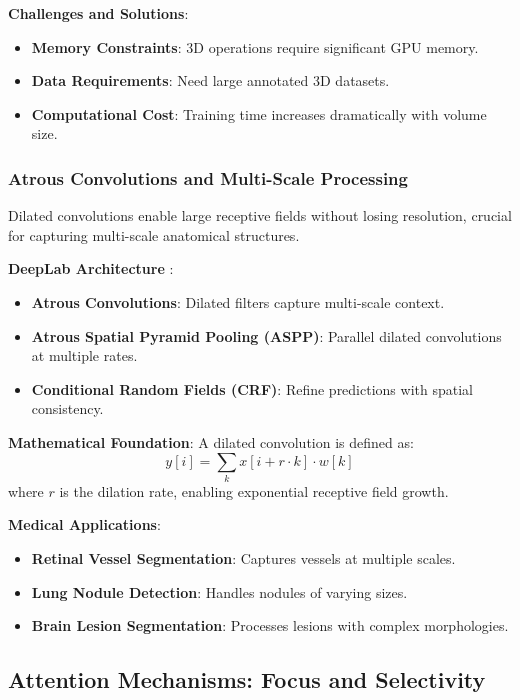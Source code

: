 \documentclass[12pt,a4paper]{article}
\begin{document}
\textbf{Challenges and Solutions}:
\begin{itemize}
    \item \textbf{Memory Constraints}: 3D operations require significant GPU memory.
    \item \textbf{Data Requirements}: Need large annotated 3D datasets.
    \item \textbf{Computational Cost}: Training time increases dramatically with volume size.
\end{itemize}

\subsubsection{Atrous Convolutions and Multi-Scale Processing}

Dilated convolutions enable large receptive fields without losing resolution, crucial for capturing multi-scale anatomical structures.

\textbf{DeepLab Architecture} \cite{chen2017deeplab}:
\begin{itemize}
    \item \textbf{Atrous Convolutions}: Dilated filters capture multi-scale context.
    \item \textbf{Atrous Spatial Pyramid Pooling (ASPP)}: Parallel dilated convolutions at multiple rates.
    \item \textbf{Conditional Random Fields (CRF)}: Refine predictions with spatial consistency.
\end{itemize}

\textbf{Mathematical Foundation}:
A dilated convolution is defined as:
\begin{equation}
y[i] = \sum_{k} x[i + r \cdot k] \cdot w[k]
\end{equation}
where $r$ is the dilation rate, enabling exponential receptive field growth.

\textbf{Medical Applications}:
\begin{itemize}
    \item \textbf{Retinal Vessel Segmentation}: Captures vessels at multiple scales.
    \item \textbf{Lung Nodule Detection}: Handles nodules of varying sizes.
    \item \textbf{Brain Lesion Segmentation}: Processes lesions with complex morphologies.
\end{itemize}

\subsection{Attention Mechanisms: Focus and Selectivity}
\end{document}
